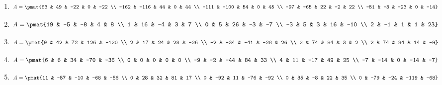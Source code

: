 \begin{enumerate}
\item

\begin{align*}
A = \pmat{63 & 49 & -22 & 0 & -22 \\ -162 & -116 & 44 & 0 & 44 \\ -111 & -100 & 54 & 0 & 45 \\ -97 & -65 & 22 & -2 & 22 \\ -51 & -3 & -23 & 0 & -14}
\end{align*}

\item

\begin{align*}
A = \pmat{19 & -5 & -8 & 4 & 8 \\ 1 & 16 & -4 & 3 & 7 \\ 0 & 5 & 26 & -3 & -7 \\ -3 & 5 & 3 & 16 & -10 \\ 2 & -1 & 1 & 1 & 23}
\end{align*}

\item

\begin{align*}
A = \pmat{9 & 42 & 72 & 126 & -120 \\ 2 & 17 & 24 & 28 & -26 \\ -2 & -34 & -41 & -28 & 26 \\ 2 & 74 & 84 & 3 & 2 \\ 2 & 74 & 84 & 14 & -9}
\end{align*}

\item

\begin{align*}
A = \pmat{6 & 6 & 34 & -70 & -36 \\ 0 & 0 & 0 & 0 & 0 \\ -9 & -2 & -44 & 84 & 33 \\ 4 & 11 & -17 & 49 & 25 \\ -7 & -14 & 0 & -14 & -7}
\end{align*}

\item

\begin{align*}
A = \pmat{11 & -57 & -10 & -68 & -56 \\ 0 & 28 & 32 & 81 & 17 \\ 0 & -92 & 11 & -76 & -92 \\ 0 & 35 & -8 & 22 & 35 \\ 0 & -79 & -24 & -119 & -68}
\end{align*}


\end{enumerate}

